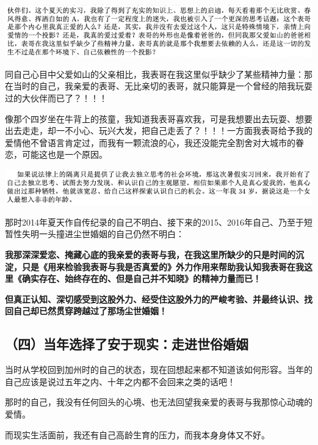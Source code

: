 \documentclass[9pt, b5paper]{article}
\begin{document}
\begin{center}
\includegraphics[width=.9\linewidth]{./pic/backups_plans_20210422_075555.png}
\end{center}

同自己心目中父爱如山的父亲相比，我表哥在我这里似乎缺少了某些精神力量：那在当时的自己，我亲爱的表哥、无比亲切的表哥，就只能算是一个曾经的陪我玩耍过的大伙伴而已了？！！！

像那个四岁坐在牛背上的孩童，我知道我表哥喜欢我，可是我想要出去玩耍、想要出去走走，却一不小心、玩兴大发，把自己走丢了？！！！一方面我表哥给予我的爱情他不曾语言肯定过，而我有一颗流浪的心，我还没能完全割舍对大城市的眷恋，可能这也是一个原因。

\begin{center}
\includegraphics[width=.9\linewidth]{./pic/backups_plans_20210422_075830.png}
\end{center}

那时2014年夏天作自传纪录的自己不明白、接下来的2015、2016年自己、乃至于短暂性失明一头撞进尘世婚姻的自己仍然不明白：

\textbf{我那深深爱恋、掩藏心底的我亲爱的表哥与我，在我这里所缺少的只是时间的沉淀，只是《用来检验我表哥与我是否真爱的》外力作用来帮助我认知我表哥在我这里《确实存在、始终存在的、但是自己并不知晓》的精神力量而已！}

\textbf{但真正认知、深切感受到这股外力、经受住这股外力的严峻考验、并最终认识、找回自己却已然贯穿跨越过了那场尘世婚姻！}

\subsection{（四）当年选择了安于现实：走进世俗婚姻}
\label{sec:org6cb61ca}

当时从学校回到加州时的自己的状态，现在回想起来都不知道该如何形容。当年的自己应该是说过五年之内、十年之内都不会回来之类的话吧！

那时的自己，我没有任何回头的心境、也无法回望我亲爱的表哥与我那惊心动魂的爱情。 

而现实生活面前，我还有自己高龄生育的压力，而我本身身体又不好。
\end{document}
